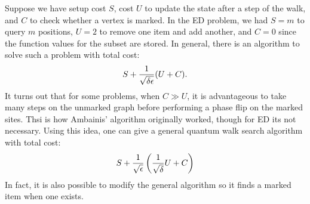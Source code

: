 Suppose we have setup cost $S$, cost $U$ to update the state after a step of the walk, and $C$ to check whether a vertex is marked. In the ED problem, we had $S = m$ to query $m$ positions, $U = 2$ to remove one item and add another, and $C = 0$ since the function values for the subset are stored. In general, there is an algorithm to solve such a problem with total cost:
\begin{equation}
    S + \frac{1}{\sqrt{\delta\epsilon}}(U + C).
\end{equation}
It turns out that for some problems, when $C \gg U$, it is advantageous to take many steps on the unmarked graph before performing a phase flip on the marked sites. Thsi is how Ambainis' algorithm originally worked, though for ED its not necessary. Using this idea, one can give a general quantum walk search algorithm with total cost:
\begin{equation}
    S + \frac{1}{\sqrt{\epsilon}}\left(\frac{1}{\sqrt{\delta}}U + C\right)
\end{equation}
In fact, it is also possible to modify the general algorithm so it finds a marked item when one exists.